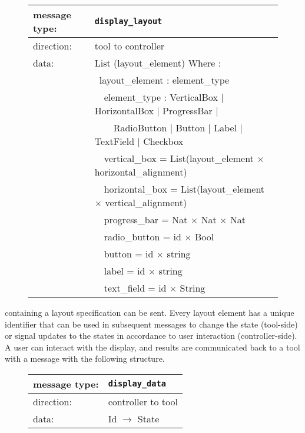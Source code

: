 \documentclass{article}
\newcommand{\msg}[1]{\texttt{#1}}
\begin{document}
   \begin{figure}[H]
    \begin{tabular}{|ll|}
     \hline
      message type:   & \msg{display\_layout} \\
     \hline
      direction:      & tool to controller \\
      data:           & List (layout\_element) Where :\\
                      & \ layout\_element :  element\_type \\
                      & \ \ element\_type   : VerticalBox $|$ HorizontalBox $|$ ProgressBar $|$ \\
                      & \ \ \ \ RadioButton $|$ Button $|$ Label $|$ TextField $|$ Checkbox \\
                      & \ \ vertical\_box   = List(layout\_element $\times$ horizontal\_alignment) \\
                      & \ \ horizontal\_box = List(layout\_element $\times$ vertical\_alignment) \\
                      & \ \ progress\_bar = Nat $\times$ Nat $\times$ Nat \\
                      & \ \ radio\_button = id $\times$ Bool \\
                      & \ \ button        = id $\times$ string \\
                      & \ \ label         = id $\times$ string \\
                      & \ \ text\_field   = id $\times$ String \\
     \hline
    \end{tabular}
   \end{figure}

   \noindent containing a layout specification can be sent. Every layout
   element has a unique identifier that can be used in subsequent messages to
   change the state (tool-side) or signal updates to the states in accordance
   to user interaction (controller-side).  A user can interact with the
   display, and results are communicated back to a tool with a message with the
   following structure.

   \begin{figure}[H]
    \begin{tabular}{|ll|}
     \hline
      message type:   & \msg{display\_data} \\
     \hline
      direction:      & controller to tool \\
      data:           & Id $\rightarrow$ State \\
     \hline
    \end{tabular}
   \end{figure}
\end{document}
